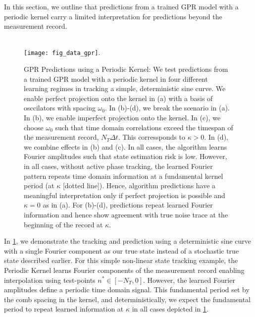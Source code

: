 In this section, we outline that predictions from a trained GPR model with a periodic kernel carry a limited interpretation for predictions beyond the measurement record.
\\
\\
\begin{figure}
    \caption{\label{fig:main:fig_data_gpr} GPR Predictions using a Periodic Kernel: We test predictions from a trained GPR model with a periodic kernel in four different learning regimes in tracking a simple, deterministic sine curve. We enable perfect projection onto the kernel in (a) with a basis of osccilators with spacing $\omega_0$. In (b)-(d), we break the scenario in (a). In (b), we enable  imperfect projection onto the kernel. In (c), we choose $\omega_0$ such that time domain correlations exceed the timespan of the measurement record, $N_T \Delta t$. This corressponds to $\kappa >0$. In (d), we combine effects in (b) and (c). In all cases, the algorithm learns Fourier amplitudes such that state estimation risk is low. However, in all cases, without active phase tracking, the learned Fourier pattern repeats time domain information at a fundamental kernel period (at $\kappa$ [dotted line]). Hence, algorithm predictions have a meaningful interpretation only if perfect projection is possible and $\kappa=0$ as in (a). For (b)-(d), predictions repeat learned Fourier information and hence show agreement with true noise trace at the beginning of the record at $\kappa$.}
    \texttt{[image: fig\_data\_gpr]}. 
\end{figure}
In \cref{fig:main:fig_data_gpr}, we demonstrate the tracking and prediction using a deterministic sine curve with a single Fourier component as our true state instead of a stochastic true state described earlier. For this simple non-linear state tracking example, the Periodic Kernel learns Fourier components of the measurement record enabling interpolation using test-points $n^* \in [-N_T, 0]$. However, the learned Fourier amplitudes define a periodic time domain signal. This fundamental period set by the comb spacing in the kernel, and deterministically, we expect the fundamental period to repeat learned information at $\kappa$ in all cases depicted in \cref{fig:main:fig_data_gpr}.
\\
\\
